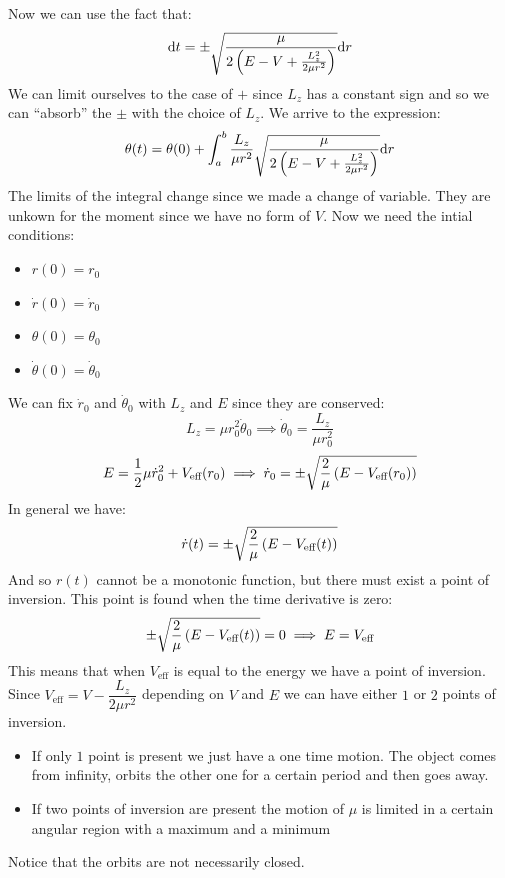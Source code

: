 Now we can use the fact that:
\begin{equation}
  \mathrm{d}t = \pm\sqrt{\dfrac{\mu}{2\left(E - V + \frac{L_z^2}{2\mu r^2}\right)}}\mathrm{d}r
\end{equation}
We can limit ourselves to the case of $+$ since $L_z$ has a constant sign and so we can ``absorb'' the $\pm$ with the choice of $L_z$. We arrive to the expression:
\begin{equation}
  \theta(t) = \theta(0) + \int_{a}^{b}\dfrac{L_z}{\mu r^2}\sqrt{\dfrac{\mu}{2\left(E - V + \frac{L_z^2}{2\mu r^2}\right)}}\mathrm{d}r
\end{equation}
The limits of the integral change since we made a change of variable. They are unkown for the moment since we have no form of $V$. Now we need the intial conditions:
\begin{itemize}
  \item $r(0) = r_0$
  \item $\dot{r}(0) = \dot{r}_0$
  \item $\theta(0) = \theta_0$
  \item $\dot{\theta}(0) = \dot{\theta}_0$
\end{itemize}
We can fix $\dot{r}_0$ and $\dot{\theta}_0$ with $L_z$ and $E$ since they are conserved:
\begin{equation}
  L_z = \mu r_0^2 \dot{\theta}_0 \implies \dot{\theta}_0 = \dfrac{L_z}{\mu r_0^2}
\end{equation}
\begin{equation}
  E = \dfrac{1}{2}\mu\dot{r}_0^2 + V_{\text{eff}}(r_0) \implies \dot{r}_0 = \pm\sqrt{\dfrac{2}{\mu}\left(E - V_{\text{eff}}(r_0)\right)}
\end{equation}
In general we have:
\begin{equation}
    \dot{r}(t) = \pm\sqrt{\dfrac{2}{\mu}\left(E - V_{\text{eff}}(t)\right)}
\end{equation}
And so $r(t)$ cannot be a monotonic function, but there must exist a point of inversion. This point is found when the time derivative is zero:
\begin{equation}
    \pm\sqrt{\dfrac{2}{\mu}\left(E - V_{\text{eff}}(t)\right)} = 0 \implies E = V_{\text{eff}}
\end{equation}
This means that when $V_{\text{eff}}$ is equal to the energy we have a point of inversion. Since $V_{\text{eff}} = V - \dfrac{L_z}{2\mu r^2}$ depending on $V$ and $E$ we can have either $1$ or $2$ points of inversion.
\begin{itemize}
    \item If only $1$ point is present we just have a one time motion. The object comes from infinity, orbits the other one for a certain period and then goes away.
    \item If two points of inversion are present the motion of $\mu$ is limited in a certain angular region with a maximum and a minimum
\end{itemize}
Notice that the orbits are not necessarily closed.
